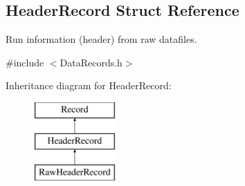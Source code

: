 \hypertarget{structHeaderRecord}{
\subsection{HeaderRecord Struct Reference}
\label{structHeaderRecord}
}


Run information (header) from raw datafiles.  




{\ttfamily \#include $<$DataRecords.h$>$}

Inheritance diagram for HeaderRecord:\begin{figure}[H]
\begin{center}
\leavevmode
\includegraphics[height=3.000000cm]{structHeaderRecord}
\end{center}
\end{figure}
